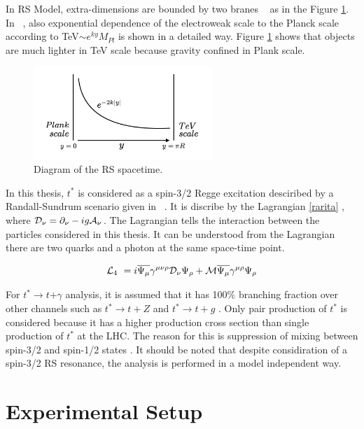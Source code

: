 \documentclass[12pt,oneandhalf,chaparabic,phys,ms,eng]{metu}
\begin{document}
In RS Model, extra-dimensions are bounded by two branes ~\cite{R10} as in the Figure \ref{brane}.  In ~\cite{R10}, also exponential dependence of the electroweak scale to the Planck scale according to  TeV$\sim$$e^{ky}M_{Pl}$ is shown in a detailed way. Figure \ref{brane} shows that objects are much lighter in TeV scale because gravity confined in Plank scale.

\begin{figure}  [!htbptbp]
\centering
    \includegraphics[width=0.6\textwidth]{branes}
    \caption{\label{brane}Diagram of the RS spacetime. ~\cite{R10}}
\end{figure}

In this thesis, $t^*$ is considered as a spin-3/2 Regge excitation desciribed by a Randall-Sundrum scenario given in  ~\cite{R7}. It is discribe by the Lagrangian \ref{rarita} \cite{R13}, where ${\cal D}_{\nu} = \partial_{\nu}-ig{\cal A}_{\nu}$. The Lagrangian tells the interaction between the particles considered in this thesis. It can be understood from the Lagrangian  there are  two quarks and a photon at the same space-time point.

\begin{eqnarray}
\label{rarita}
	{\cal L}_{4} \ = i \overline {\Psi_\mu} \gamma^{\mu\nu\rho} {\cal D}_{\nu}{\Psi_\rho}+{\cal M}\overline {\Psi_\mu} \gamma^{\mu\rho} {\Psi_{\rho}}
%
%
\end{eqnarray}

For $t^*$$\rightarrow$$t$+$\gamma$ analysis, it is assumed that it has 100$\%$ branching fraction over other channels such as $t^* \rightarrow t+Z$ and $t^* \rightarrow t+g$ . Only pair production of $t^*$ is considered because it has a higher production cross section than single production of $t^*$ at the LHC. The reason for this is suppression of mixing between spin-3/2 and spin-1/2 states \cite{R7,R11}. It should be noted that despite considiration of a spin-3/2 RS resonance, the analysis is performed in a model independent way.

\chapter{Experimental Setup}
\end{document}
